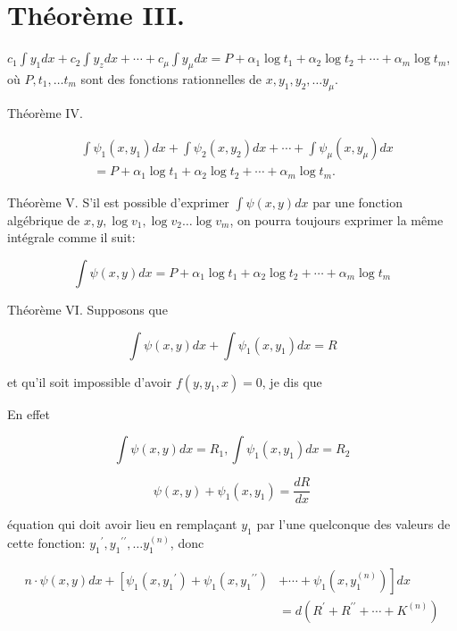 \documentclass{article}
\begin{document}
\section*{Théorème III.}

\(c_{1} \int y_{1} d x+c_{2} \int y_{z} d x+\cdots+c_{\mu} \int y_{\mu} d x=P+\alpha_{1} \log t_{1}+\alpha_{2} \log t_{2}+\cdots+\alpha_{m} \log t_{m}\), où \(P, t_{1}, \ldots t_{m}\) sont des fonctions rationnelles de \(x, y_{1}, y_{2}, \ldots y_{\mu}\).

Théorème IV.

\[
\begin{aligned}
& \int \psi_{1}\left(x, y_{1}\right) d x+\int \psi_{2}\left(x, y_{2}\right) d x+\cdots+\int \psi_{\mu}\left(x, y_{\mu}\right) d x \\
& \quad=P+\alpha_{1} \log t_{1}+\alpha_{2} \log t_{2}+\cdots+\alpha_{m} \log t_{m} .
\end{aligned}
\]

Théorème V. S'il est possible d'exprimer \(\int \psi(x, y) d x\) par une fonction algébrique de \(x, y, \log v_{1}, \log v_{2} \ldots \log v_{m}\), on pourra toujours exprimer la même intégrale comme il suit:

\[
\int \psi(x, y) d x=P+\alpha_{1} \log t_{1}+\alpha_{2} \log t_{2}+\cdots+\alpha_{m} \log t_{m}
\]

Théorème VI. Supposons que

\[
\int \psi(x, y) d x+\int \psi_{1}\left(x, y_{1}\right) d x=R
\]

et qu'il soit impossible d'avoir \(f\left(y, y_{1}, x\right)=0\), je dis que

En effet

\[
\int \psi(x, y) d x=R_{1}, \int \psi_{1}\left(x, y_{1}\right) d x=R_{2}
\]

\[
\psi(x, y)+\psi_{1}\left(x, y_{1}\right)=\frac{d R}{d x}
\]

équation qui doit avoir lieu en remplaçant \(y_{1}\) par l'une quelconque des valeurs de cette fonction: \(y_{1}{ }^{\prime}, y_{1}{ }^{\prime \prime}, \ldots y_{1}^{(n)}\), donc

\[
\begin{aligned}
n \cdot \psi(x, y) d x+\left[\psi_{1}\left(x, y_{1}{ }^{\prime}\right)+\psi_{1}\left(x, y_{1}{ }^{\prime \prime}\right)\right. & \left.+\cdots+\psi_{1}\left(x, y_{1}^{(n)}\right)\right] d x \\
& =d\left(R^{\prime}+R^{\prime \prime}+\cdots+K^{(n)}\right)
\end{aligned}
\]
\end{document}
